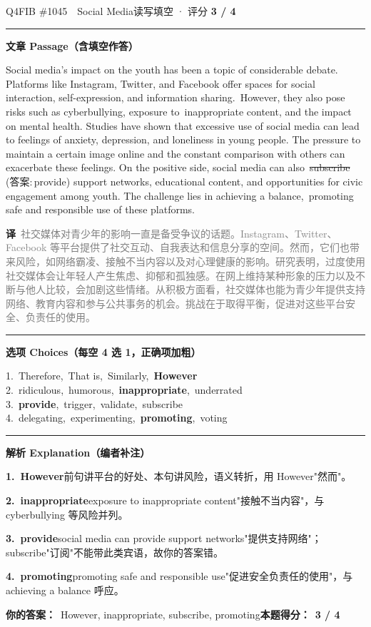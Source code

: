 \documentclass[11pt]{article}
\newcommand{\ptesub}[1]{%
  \par\needspace{2\baselineskip}\smallskip
  {\color{cAccent}\rule[-0.2ex]{3pt}{1.05em}}\hspace{6pt}%
  {\bfseries\color{cHead}#1}\par\nopagebreak\smallskip}
\newcommand{\zh}[1]{{\footnotesize\textcolor{cNote}{\textbf{译}}\ \textcolor{gray}{#1}}}
\newcommand{\rok}[1]{{\color{cFix}\ding{51}\,#1}}                 %
\newcommand{\rno}[2]{{\color{cWrong}\ding{55}\,\sout{#1}}\,{\footnotesize\color{cFix}(答案:\,#2)}}  %
\begin{document}
\begin{qblock}{Q4\quad FIB \#1045\ \ Social Media}{读写填空 · 评分 \textcolor{cAccent}{\bfseries 3 / 4}}
\ptesub{文章 Passage（含填空作答）}
\begin{promptbox}
Social media's impact on the youth has been a topic of considerable debate. Platforms like Instagram, Twitter, and Facebook offer spaces for social interaction, self-expression, and information sharing. \rok{However}, they also pose risks such as cyberbullying, exposure to \rok{inappropriate} content, and the impact on mental health. Studies have shown that excessive use of social media can lead to feelings of anxiety, depression, and loneliness in young people. The pressure to maintain a certain image online and the constant comparison with others can exacerbate these feelings. On the positive side, social media can also \rno{subscribe}{provide} support networks, educational content, and opportunities for civic engagement among youth. The challenge lies in achieving a balance, \rok{promoting} safe and responsible use of these platforms.
\end{promptbox}
\zh{社交媒体对青少年的影响一直是备受争议的话题。Instagram、Twitter、Facebook 等平台提供了社交互动、自我表达和信息分享的空间。然而，它们也带来风险，如网络霸凌、接触不当内容以及对心理健康的影响。研究表明，过度使用社交媒体会让年轻人产生焦虑、抑郁和孤独感。在网上维持某种形象的压力以及不断与他人比较，会加剧这些情绪。从积极方面看，社交媒体也能为青少年提供支持网络、教育内容和参与公共事务的机会。挑战在于取得平衡，促进对这些平台安全、负责任的使用。}
\ptesub{选项 Choices（每空 4 选 1，正确项加粗）}
{\small
1.\ Therefore,\ That is,\ Similarly,\ \textbf{However}\\
2.\ ridiculous,\ humorous,\ \textbf{inappropriate},\ underrated\\
3.\ \textbf{provide},\ trigger,\ validate,\ subscribe\\
4.\ delegating,\ experimenting,\ \textbf{promoting},\ voting}
\ptesub{解析 Explanation（编者补注）}
\begin{notebox}\footnotesize
\textbf{1.\ However}\quad 前句讲平台的好处、本句讲风险，语义转折，用 However"然而"。\par\smallskip
\textbf{2.\ inappropriate}\quad exposure to inappropriate content"接触不当内容"，与 cyberbullying 等风险并列。\par\smallskip
\textbf{3.\ provide}\quad social media can provide support networks"提供支持网络"；subscribe"订阅"不能带此类宾语，故你的答案错。\par\smallskip
\textbf{4.\ promoting}\quad promoting safe and responsible use"促进安全负责任的使用"，与 achieving a balance 呼应。
\end{notebox}
\smallskip
\textbf{你的答案：}\ However, inappropriate, {\color{cWrong}subscribe}, promoting\qquad\textbf{本题得分：}\ {\color{cAccent}\bfseries 3 / 4}
\end{qblock}
\end{document}
